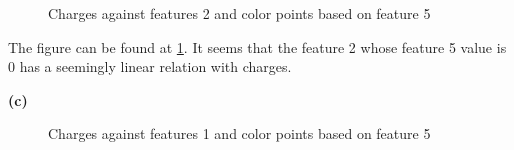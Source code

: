 \documentclass{article}
\begin{document}
\begin{figure}[!htbp]
\centering
{}
\caption{Charges against features 2 and color points based on feature 5} \label{3_2_b_1}
\end{figure}

The figure can be found at \ref{3_2_b_1}. It seems that the feature 2 whose feature 5 value is 0 has a seemingly linear relation with charges.\bigbreak

\noindent \textbf{(c)} \bigbreak

\begin{figure}[!htbp]
\centering
{}
\caption{Charges against features 1 and color points based on feature 5} \label{3_2_c_1}
\end{figure}
\end{document}
